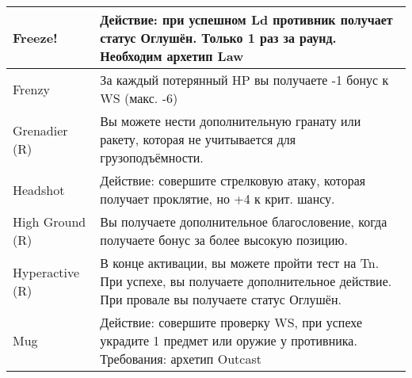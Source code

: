 \begin{table}[h]
\begin{tabularx}{\textwidth}{|l|X|}
    Freeze!            & Действие: при успешном Ld противник получает статус Оглушён. Только 1 раз за раунд. Необходим архетип Law                                                                                                                          \\ \hline
    Frenzy             & За каждый потерянный HP вы получаете -1 бонус к WS (макс. -6)                                                                                                                                                                      \\ \hline
    Grenadier (R)      & Вы можете нести дополнительную гранату или ракету, которая не учитывается для грузоподъёмности.                                                                                                                                    \\ \hline
    Headshot           & Действие: совершите стрелковую атаку, которая получает проклятие, но +4 к крит. шансу.                                                                                                                                             \\ \hline
    High Ground (R)    & Вы получаете дополнительное благословение, когда получаете бонус за более высокую позицию.                                                                                                                                         \\ \hline
    Hyperactive (R)    & В конце активации, вы можете пройти тест на Tn. При успехе, вы получаете дополнительное действие. При провале вы получаете статус Оглушён.                                                                                         \\ \hline
    Mug                & Действие: совершите проверку WS, при успехе украдите 1 предмет или оружие у противника. Требования: архетип Outcast                                                                                                                \\ \hline
    \end{tabularx}
    \end{table}


